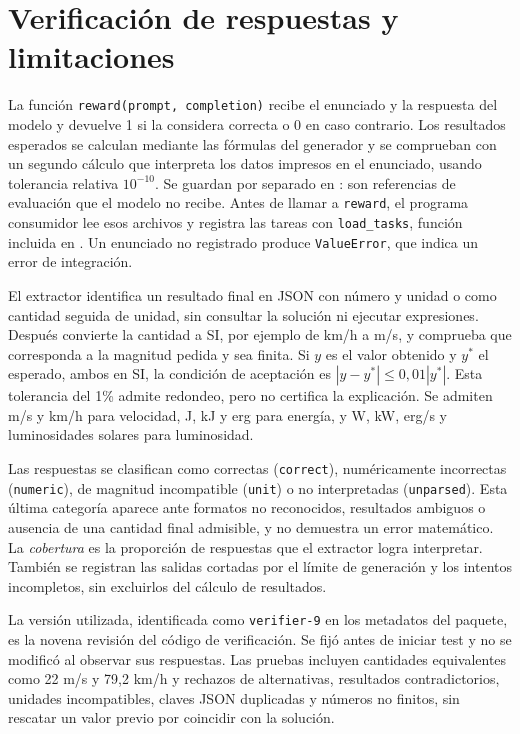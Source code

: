 \section{Verificación de respuestas y limitaciones}
La función \texttt{reward(prompt, completion)} recibe el enunciado y la respuesta
del modelo y devuelve 1 si la considera correcta o 0 en caso contrario. Los
resultados esperados se calculan mediante las fórmulas del generador y se
comprueban con un segundo cálculo que interpreta los datos impresos en el
enunciado, usando tolerancia relativa $10^{-10}$. Se guardan por separado en
: son referencias de evaluación que el modelo no
recibe. Antes de llamar a \texttt{reward}, el programa
consumidor lee esos archivos y registra las tareas con \texttt{load\_tasks},
función incluida en . Un enunciado no
registrado produce \texttt{ValueError}, que indica un error de integración.

El extractor identifica un resultado final en JSON con número y unidad o como
cantidad seguida de unidad, sin consultar la solución ni ejecutar expresiones.
Después convierte la cantidad a SI, por ejemplo de km/h a m/s, y comprueba
que corresponda a la magnitud pedida y sea finita. Si $y$ es el valor obtenido
y $y^*$ el esperado, ambos en SI, la condición de aceptación es
$|y-y^*|\leq0{,}01|y^*|$. Esta tolerancia del 1\% admite redondeo, pero no
certifica la explicación. Se admiten m/s y km/h para velocidad, J, kJ y erg
para energía, y W, kW, erg/s y luminosidades solares para luminosidad.

Las respuestas se clasifican como correctas (\texttt{correct}), numéricamente
incorrectas (\texttt{numeric}), de magnitud incompatible (\texttt{unit}) o no
interpretadas (\texttt{unparsed}). Esta última categoría aparece ante formatos
no reconocidos, resultados ambiguos o ausencia de una cantidad final admisible,
y no demuestra un error matemático. La \emph{cobertura} es la proporción de
respuestas que el extractor logra interpretar. También se registran las salidas
cortadas por el límite de generación y los intentos incompletos, sin excluirlos
del cálculo de resultados.

La versión utilizada, identificada como \texttt{verifier-9} en los metadatos del
paquete, es la novena revisión del código de verificación. Se fijó antes de
iniciar test y no se modificó al observar sus respuestas. Las pruebas incluyen
cantidades equivalentes como 22 m/s y 79,2 km/h y rechazos de alternativas,
resultados contradictorios, unidades incompatibles, claves JSON duplicadas y
números no finitos, sin rescatar un valor previo por coincidir con la solución.

